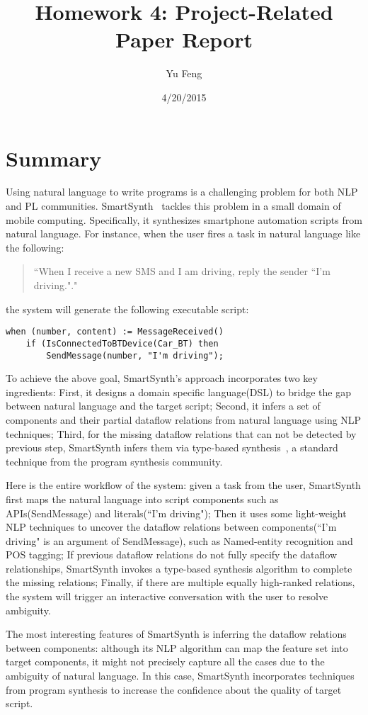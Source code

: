 \documentclass[10pt]{article}
\title{Homework 4: Project-Related Paper Report}
\author{Yu Feng}
\date{4/20/2015}
\begin{document}
\maketitle

\section{Summary}\label{sec:intro}
Using natural language to write programs is a challenging problem for both NLP 
and PL communities. SmartSynth~\cite{smart} tackles this problem in a small domain of mobile computing. Specifically, it synthesizes smartphone automation scripts from natural language. For instance, when the user fires a task in natural language 
like the following:
\begin{quotation}
``When I receive a new SMS and I am driving, reply the sender ``I'm driving."."
\end{quotation}
the system will generate the following executable script:
\small\begin{verbatim}
when (number, content) := MessageReceived()
    if (IsConnectedToBTDevice(Car_BT) then
        SendMessage(number, "I'm driving");
\end{verbatim}
To achieve the above goal, SmartSynth's approach incorporates two key ingredients: First, it designs
a domain specific language(DSL) to bridge the gap between natural language and the
target script; Second, it infers a set of components and their partial dataflow relations 
from natural language using NLP techniques; Third, for the missing dataflow relations that can not 
be detected by previous step, SmartSynth infers them via type-based synthesis~\citep{typebase}, 
a standard technique from the program synthesis community.

Here is the entire workflow of the system: given a task from the user, 
SmartSynth first maps the natural language into script components such as
APIs(SendMessage) and literals(``I'm driving"); Then it uses some light-weight NLP techniques
to uncover the dataflow relations between components(``I'm driving" is an argument of SendMessage),
such as Named-entity recognition and POS tagging; If previous dataflow relations do not fully specify
the dataflow relationships, SmartSynth invokes a type-based synthesis algorithm to complete the 
missing relations; Finally, if there are multiple equally high-ranked relations, the system will
trigger an interactive conversation with the user to resolve ambiguity.

The most interesting features of SmartSynth is inferring the dataflow relations between
components: although its NLP algorithm can map the feature set into target components,
it might not precisely capture all the cases due to the ambiguity of natural language.
In this case, SmartSynth incorporates techniques from program synthesis to increase
the confidence about the quality of target script.
\end{document}
